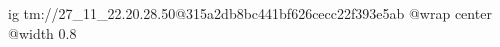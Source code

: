  
 
 
 
 

\qqSecCmtScr


\ifcmt
  ig tm://27_11_22.20.28.50@315a2db8bc441bf626cecc22f393e5ab
  @wrap center
  @width 0.8
\fi


